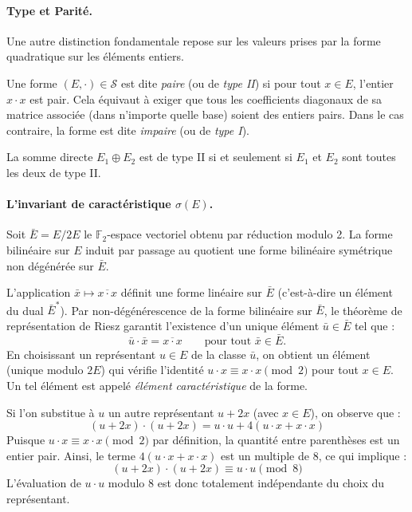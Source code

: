 \paragraph{Type et Parité.}
Une autre distinction fondamentale repose sur les valeurs prises par la forme quadratique sur les éléments entiers.

\begin{definition}
Une forme $(E, \cdot) \in \mathcal{S}$ est dite \emph{paire} (ou de \emph{type II}) si pour tout $x \in E$, l'entier $x \cdot x$ est pair. Cela équivaut à exiger que tous les coefficients diagonaux de sa matrice associée (dans n'importe quelle base) soient des entiers pairs. Dans le cas contraire, la forme est dite \emph{impaire} (ou de \emph{type I}).
\end{definition}

\begin{remark}
La somme directe $E_1 \oplus E_2$ est de type II si et seulement si $E_1$ et $E_2$ sont toutes les deux de type II.
\end{remark}

\paragraph{L'invariant de caractéristique $\sigma(E)$.}
Soit $\bar{E} = E/2E$ le $\mathbb{F}_2$-espace vectoriel obtenu par réduction modulo 2. La forme bilinéaire sur $E$ induit par passage au quotient une forme bilinéaire symétrique non dégénérée sur $\bar{E}$.

L'application $\bar{x} \mapsto \overline{x \cdot x}$ définit une forme linéaire sur $\bar{E}$ (c'est-à-dire un élément du dual $\bar{E}^*$). Par non-dégénérescence de la forme bilinéaire sur $\bar{E}$, le théorème de représentation de Riesz garantit l'existence d'un unique élément $\bar{u} \in \bar{E}$ tel que :
\[
\bar{u} \cdot \bar{x} = \overline{x \cdot x} \qquad \text{pour tout } \bar{x} \in \bar{E}.
\]
En choisissant un représentant $u \in E$ de la classe $\bar{u}$, on obtient un élément (unique modulo $2E$) qui vérifie l'identité $u \cdot x \equiv x \cdot x \pmod{2}$ pour tout $x \in E$. Un tel élément est appelé \emph{élément caractéristique} de la forme.

Si l'on substitue à $u$ un autre représentant $u + 2x$ (avec $x \in E$), on observe que :
\[
(u + 2x) \cdot (u + 2x) = u \cdot u + 4(u \cdot x + x \cdot x)
\]
Puisque $u \cdot x \equiv x \cdot x \pmod{2}$ par définition, la quantité entre parenthèses est un entier pair. Ainsi, le terme $4(u \cdot x + x \cdot x)$ est un multiple de $8$, ce qui implique :
\[
(u + 2x) \cdot (u + 2x) \equiv u \cdot u \pmod{8}
\]
L'évaluation de $u \cdot u$ modulo 8 est donc totalement indépendante du choix du représentant.

